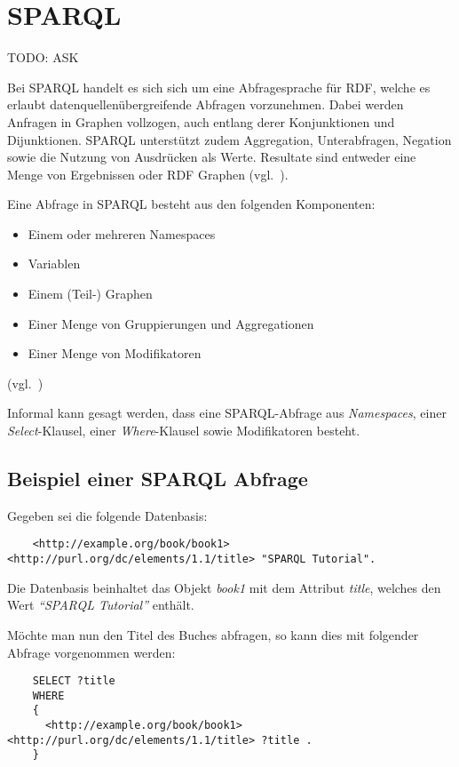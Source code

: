 \chapter{SPARQL}
\label{chap:sparql}
TODO: ASK 

Bei SPARQL handelt es sich sich um eine Abfragesprache für RDF, welche es erlaubt datenquellenübergreifende Abfragen vorzunehmen. Dabei werden Anfragen in Graphen vollzogen, auch entlang derer Konjunktionen und Dijunktionen. SPARQL unterstützt zudem Aggregation, Unterabfragen, Negation sowie die Nutzung von Ausdrücken als Werte. Resultate sind entweder eine Menge von Ergebnissen oder RDF Graphen (vgl.~\cite[Abstract]{w3sparql_querylang}).

Eine Abfrage in SPARQL besteht aus den folgenden Komponenten:
\begin{itemize}
    \item Einem oder mehreren Namespaces
    \item Variablen
    \item Einem (Teil-) Graphen
    \item Einer Menge von Gruppierungen und Aggregationen
    \item Einer Menge von Modifikatoren
\end{itemize}
(vgl.~\cite[18.1.10 SPARQL Query]{w3sparql_querylang})

Informal kann gesagt werden, dass eine SPARQL-Abfrage aus \textit{Namespaces}, einer \textit{Select}-Klausel, einer \textit{Where}-Klausel sowie Modifikatoren besteht.

\section{Beispiel einer SPARQL Abfrage}
\label{sec:sparql_beispiel}

Gegeben sei die folgende Datenbasis:
\lstset{language=XML}
\begin{lstlisting}
    <http://example.org/book/book1> <http://purl.org/dc/elements/1.1/title> "SPARQL Tutorial".
\end{lstlisting}

Die Datenbasis beinhaltet das Objekt \textit{book1} mit dem Attribut \textit{title}, welches den Wert \textit{``SPARQL Tutorial''} enthält.

Möchte man nun den Titel des Buches abfragen, so kann dies mit folgender Abfrage vorgenommen werden:
\begin{lstlisting}
    SELECT ?title
    WHERE
    {
      <http://example.org/book/book1> <http://purl.org/dc/elements/1.1/title> ?title .
    }
\end{lstlisting}

